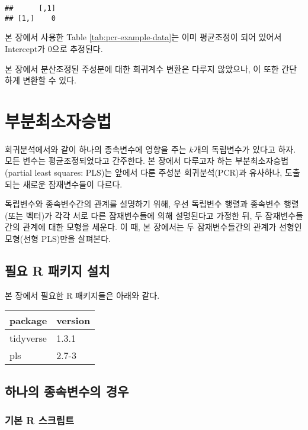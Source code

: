 \documentclass[
]{book}
\begin{document}
\begin{verbatim}
##      [,1]
## [1,]    0
\end{verbatim}

본 장에서 사용한 Table \ref{tab:pcr-example-data}는 이미 평균조정이 되어 있어서 Intercept가 0으로 추정된다.

본 장에서 분산조정된 주성분에 대한 회귀계수 변환은 다루지 않았으나, 이 또한 간단하게 변환할 수 있다.

\hypertarget{plsr}{%
\chapter{부분최소자승법}\label{plsr}}

회귀분석에서와 같이 하나의 종속변수에 영향을 주는 \(k\)개의 독립변수가 있다고 하자. 모든 변수는 평균조정되었다고 간주한다. 본 장에서 다루고자 하는 부분최소자승법(partial least squares: PLS)는 앞에서 다룬 주성분 회귀분석(PCR)과 유사하나, 도출되는 새로운 잠재변수들이 다르다.

독립변수와 종속변수간의 관계를 설명하기 위해, 우선 독립변수 행렬과 종속변수 행렬(또는 벡터)가 각각 서로 다른 잠재변수들에 의해 설명된다고 가정한 뒤, 두 잠재변수들간의 관계에 대한 모형을 세운다. 이 때, 본 장에서는 두 잠재변수들간의 관계가 선형인 모형(선형 PLS)만을 살펴본다.

\hypertarget{plsr-packages-install}{%
\section{필요 R 패키지 설치}\label{plsr-packages-install}}

본 장에서 필요한 R 패키지들은 아래와 같다.

\begin{tabular}{l|l}
\hline
package & version\\
\hline
tidyverse & 1.3.1\\
\hline
pls & 2.7-3\\
\hline
\end{tabular}

\hypertarget{plsr-single-target}{%
\section{하나의 종속변수의 경우}\label{plsr-single-target}}

\hypertarget{plsr-basic-script}{%
\subsection{기본 R 스크립트}\label{plsr-basic-script}}
\end{document}
